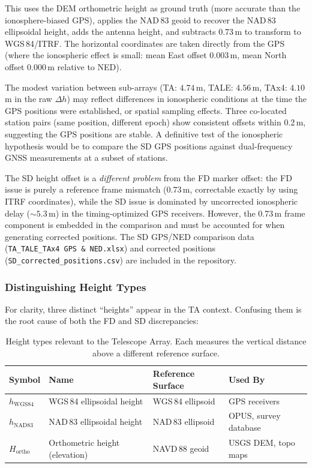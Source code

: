 \documentclass[11pt,letterpaper]{article}
\begin{document}
\noindent This uses the DEM orthometric height as ground truth (more accurate than the ionosphere-biased GPS), applies the NAD\,83 geoid to recover the NAD\,83 ellipsoidal height, adds the antenna height, and subtracts 0.73\,m to transform to WGS\,84/ITRF. The horizontal coordinates are taken directly from the GPS (where the ionospheric effect is small: mean East offset $0.003$\,m, mean North offset $0.000$\,m relative to NED).

The modest variation between sub-arrays (TA: $4.74$\,m, TALE: $4.56$\,m, TAx4: $4.10$\,m in the raw $\Delta h$) may reflect differences in ionospheric conditions at the time the GPS positions were established, or spatial sampling effects. Three co-located station pairs (same position, different epoch) show consistent offsets within 0.2\,m, suggesting the GPS positions are stable. A definitive test of the ionospheric hypothesis would be to compare the SD GPS positions against dual-frequency GNSS measurements at a subset of stations.

The SD height offset is a \emph{different problem} from the FD marker offset: the FD issue is purely a reference frame mismatch (0.73\,m, correctable exactly by using ITRF coordinates), while the SD issue is dominated by uncorrected ionospheric delay ($\sim\!5.3$\,m) in the timing-optimized GPS receivers. However, the 0.73\,m frame component is embedded in the comparison and must be accounted for when generating corrected positions. The SD GPS/NED comparison data (\texttt{TA\_TALE\_TAx4 GPS \& NED.xlsx}) and corrected positions (\texttt{SD\_corrected\_positions.csv}) are included in the repository.

\subsubsection{Distinguishing Height Types}

For clarity, three distinct ``heights'' appear in the TA context. Confusing them is the root cause of both the FD and SD discrepancies:

\begin{table}[H]
\centering
\caption{Height types relevant to the Telescope Array. Each measures the vertical distance above a different reference surface.}
\label{tab:height_types}
\smallskip
\begin{tabular}{@{}llll@{}}
\toprule
{Symbol} & {Name} & {Reference Surface} & {Used By} \\
\midrule
$h_{\text{WGS84}}$ & WGS\,84 ellipsoidal height & WGS\,84 ellipsoid & GPS receivers \\
$h_{\text{NAD83}}$ & NAD\,83 ellipsoidal height & NAD\,83 ellipsoid & OPUS, survey database \\
$H_{\text{ortho}}$ & Orthometric height (elevation) & NAVD\,88 geoid & USGS DEM, topo maps \\
\bottomrule
\end{tabular}
\end{table}
\end{document}
